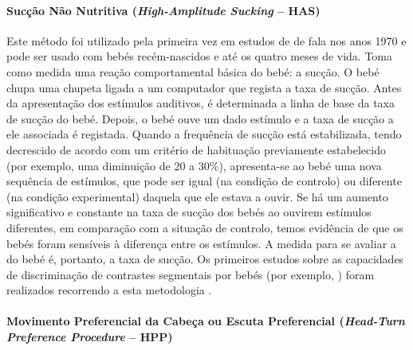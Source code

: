 \documentclass[output=paper]{LSP/langsci}
\begin{document}
\paragraph*{Sucção Não Nutritiva (\textit{High-Amplitude Sucking} -- HAS)}
Este método foi utilizado pela primeira vez em estudos de  de fala nos anos 1970 \citep{eimas_etal1971} e pode ser usado com bebés recém-nascidos e até os quatro meses de vida. Toma como medida uma reação comportamental básica do bebé: a sucção. O bebé chupa uma chupeta ligada a um computador que regista a taxa de sucção. Antes da apresentação dos estímulos auditivos, é determinada a linha de base da taxa de sucção do bebé. Depois, o bebé ouve um dado estímulo e a taxa de sucção a ele associada é registada. Quando a frequência de sucção está estabilizada, tendo decrescido de acordo com um critério de habituação previamente estabelecido (por exemplo, uma diminuição de 20 a 30\%), apresenta-se ao bebé uma nova sequência de estímulos, que pode ser igual (na condição de controlo) ou diferente (na condição experimental) daquela que ele estava a ouvir. Se há um aumento significativo e constante na taxa de sucção dos bebés ao ouvirem estímulos diferentes, em comparação com a situação de controlo, temos evidência de que os bebés foram sensíveis à diferença entre os estímulos. A medida para se avaliar a  do bebé é, portanto, a taxa de sucção. Os primeiros estudos sobre as capacidades de discriminação de contrastes segmentais por bebés (por exemplo, \textipa{[pa]/[ba]}) foram realizados recorrendo a esta metodologia \citep{jusczyk1997,gerkenaslin2005}.

\paragraph*{Movimento Preferencial da Cabeça ou Escuta Preferencial (\textit{Head-Turn Preference Procedure} -- HPP)
}
\end{document}
